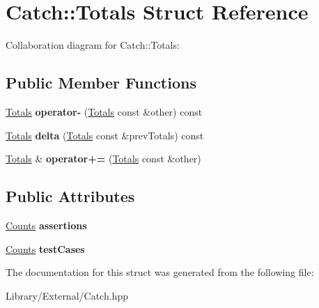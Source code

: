 \hypertarget{struct_catch_1_1_totals}{}\section{Catch\+:\+:Totals Struct Reference}
\label{struct_catch_1_1_totals}


Collaboration diagram for Catch\+:\+:Totals\+:
\subsection*{Public Member Functions}
\begin{DoxyCompactItemize}
\item 
\hypertarget{struct_catch_1_1_totals_abe15cd8a82ba9a4868dd7a542add827c}{}\hyperlink{struct_catch_1_1_totals}{Totals} {\bfseries operator-\/} (\hyperlink{struct_catch_1_1_totals}{Totals} const \&other) const \label{struct_catch_1_1_totals_abe15cd8a82ba9a4868dd7a542add827c}

\item 
\hypertarget{struct_catch_1_1_totals_a3dee0f599c081a8360c0112fb1dafe8f}{}\hyperlink{struct_catch_1_1_totals}{Totals} {\bfseries delta} (\hyperlink{struct_catch_1_1_totals}{Totals} const \&prev\+Totals) const \label{struct_catch_1_1_totals_a3dee0f599c081a8360c0112fb1dafe8f}

\item 
\hypertarget{struct_catch_1_1_totals_a574015076e54cc405c70b053e3356e43}{}\hyperlink{struct_catch_1_1_totals}{Totals} \& {\bfseries operator+=} (\hyperlink{struct_catch_1_1_totals}{Totals} const \&other)\label{struct_catch_1_1_totals_a574015076e54cc405c70b053e3356e43}

\end{DoxyCompactItemize}
\subsection*{Public Attributes}
\begin{DoxyCompactItemize}
\item 
\hypertarget{struct_catch_1_1_totals_a885ded66df752147b30c3d45aa602ec9}{}\hyperlink{struct_catch_1_1_counts}{Counts} {\bfseries assertions}\label{struct_catch_1_1_totals_a885ded66df752147b30c3d45aa602ec9}

\item 
\hypertarget{struct_catch_1_1_totals_adb195fe477aedee2ecea88c888f16506}{}\hyperlink{struct_catch_1_1_counts}{Counts} {\bfseries test\+Cases}\label{struct_catch_1_1_totals_adb195fe477aedee2ecea88c888f16506}

\end{DoxyCompactItemize}


The documentation for this struct was generated from the following file\+:\begin{DoxyCompactItemize}
\item 
Library/\+External/Catch.\+hpp\end{DoxyCompactItemize}
